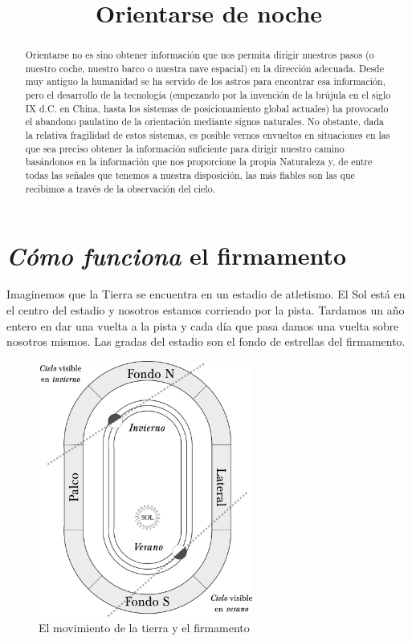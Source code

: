 \documentclass[12pt]{memoir}
\title{Orientarse de noche}
\begin{document}
\maketitle
% 
\begin{abstract}
Orientarse no es sino obtener información que nos permita dirigir nuestros pasos (o nuestro coche, nuestro barco o nuestra nave espacial) en la dirección adecuada. Desde muy antiguo la humanidad se ha servido de los astros para encontrar esa información, pero el desarrollo de la tecnología (empezando por la invención de la brújula en el siglo IX d.C. en China, hasta los sistemas de posicionamiento global actuales) ha provocado el abandono paulatino de la orientación mediante signos naturales. No obstante, dada la relativa fragilidad de estos sistemas, es posible vernos envueltos en situaciones en las que sea preciso obtener la información suficiente para dirigir nuestro camino basándonos en la información que nos proporcione la propia Naturaleza y, de entre todas las señales que tenemos a nuestra disposición, las más fiables son las que recibimos a través de la observación del cielo.
\end{abstract}

\section{\textit{Cómo funciona} el firmamento}

Imaginemos que la Tierra se encuentra en un estadio de atletismo. El Sol está en el centro del estadio y nosotros estamos corriendo por la pista. Tardamos un año entero en dar una vuelta a la pista y cada día que pasa damos una vuelta sobre nosotros mismos. Las gradas del estadio son el fondo de estrellas del firmamento. 


\begin{figure}[ht]
 \centering
 \includegraphics[width=200pt,keepaspectratio=true]{./esquema_firmamento.png}
 \caption{El movimiento de la tierra y el firmamento}
 \label{carrera_tierra}
\end{figure}
\end{document}
